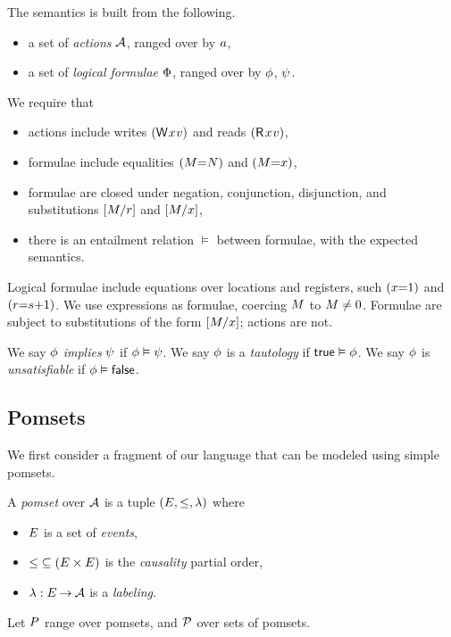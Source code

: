 The semantics is built from the following.
\begin{itemize}
\item a set of \emph{actions} $\mathcal{A}$, ranged over by $a$, 
\item a set of \emph{logical formulae} $\Phi$, ranged over by $\phi$,
  $\psi$.
\end{itemize}
We require that
\begin{itemize}
\item actions include writes $\DWP{\aLoc}{\aVal}$ and reads $\DRP{\aLoc}{\aVal}$,
\item formulae include equalities $(M{=}N)$ and $(M{=}x)$,
\item formulae are closed under negation, conjunction, disjunction, and
  substitutions $[M/r]$ and $[M/x]$, 
\item there is an entailment relation $\vDash$ between formulae, with the
  expected semantics.
\end{itemize}


Logical formulae include equations over locations and registers, such
$(x{=}1)$ and $(r{=}s{+}1)$.
We use expressions as formulae, coercing $M$ to $M\neq 0$.
Formulae are subject to substitutions of the form $[M/x]$; actions are not.

  We say
  $\phi$ \emph{implies} $\psi$ if $\phi\vDash\psi$.
  We say
  $\phi$ is a \emph{tautology} if $\mathsf{true}\vDash\phi$.
  We say
  $\phi$ is \emph{unsatisfiable} if $\phi\vDash\mathsf{false}$.

\subsection{Pomsets}

We first consider a fragment of our language that can be modeled using simple
pomsets.
\begin{definition}
  A \emph{pomset} over $\mathcal{A}$ is a tuple
  $(E, {\le}, \lambda)$ where
  \begin{itemize}
  \item $E$ is a set of \emph{events},
  \item
    ${\le} \subseteq (E\times E)$ is the \emph{causality} partial order, 
  \item
    $\lambda: E \mathbin\rightarrow \mathcal{A}$ is a \emph{labeling}.
  \end{itemize}
\end{definition}
Let $P$ range over pomsets, and $\mathcal{P}$ over sets of pomsets.

